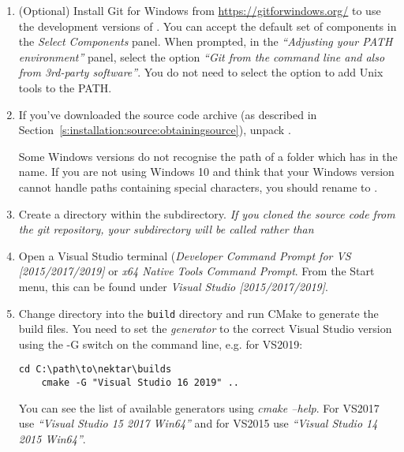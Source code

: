 \begin{enumerate}
\begin{itemize}
  \end{itemize}
  \item (Optional) Install Git for Windows from
  \url{https://gitforwindows.org/} to use the development versions of \nekpp.
  You can accept the default set of components in the \emph{Select Components}
  panel. When prompted, in the \emph{``Adjusting your PATH environment''}
  panel, select the option \emph{``Git from the command line and also from
  3rd-party software''}. You do not need to select the option to add Unix
  tools to the PATH.
  
  \item If you've downloaded the source code archive (as described in 
  Section~\ref{s:installation:source:obtainingsource}), unpack 
  .

  \begin{notebox}
    Some Windows versions do not recognise the path of a folder which has
    \inltt{++} in the name. If you are not using Windows 10 and think that your
    Windows version cannot handle paths containing special characters, you
    should rename  to .
  \end{notebox}
  \item Create a  directory within the 
  subdirectory. \textit{If you cloned the source code from the git repository,
  your \nekpp subdirectory will be called  rather than
  }
  
  \item Open a Visual Studio terminal (\emph{Developer Command Prompt for
  VS [2015/2017/2019]} or \emph{x64 Native Tools Command Prompt}. From the 
  Start menu, this can be found under \emph{Visual Studio [2015/2017/2019]}.
  
  \item Change directory into the \texttt{build} directory and run CMake to
  generate the build files. You need to set the \emph{generator} to the
  correct Visual Studio version using the -G switch on the command line, e.g.
  for VS2019:
  \begin{lstlisting}[style=BashInputStyle]
    cd C:\path\to\nektar\builds
    cmake -G "Visual Studio 16 2019" ..
  \end{lstlisting}
  You can see the list of available generators using \emph{cmake --help}. For
  VS2017 use \emph{``Visual Studio 15 2017 Win64''} and for VS2015 use
  \emph{``Visual Studio 14 2015 Win64''}.
  

\end{enumerate}
